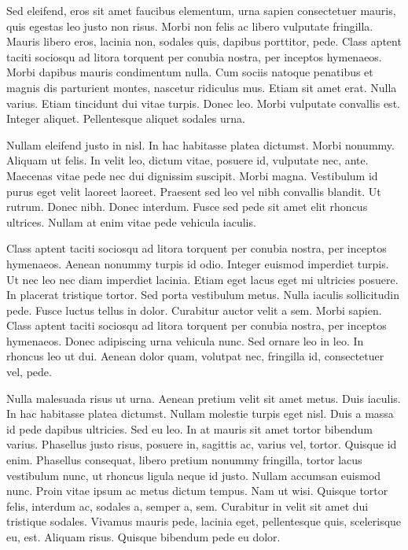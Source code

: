 \documentclass{article}
\begin{document}
Sed eleifend, eros sit amet faucibus elementum, urna sapien consectetuer
mauris, quis egestas leo justo non risus. Morbi non felis ac libero vulputate
fringilla. Mauris libero eros, lacinia non, sodales quis, dapibus porttitor,
pede. Class aptent taciti sociosqu ad litora torquent per conubia nostra, per
inceptos hymenaeos. Morbi dapibus mauris condimentum nulla. Cum sociis natoque
penatibus et magnis dis parturient montes, nascetur ridiculus mus. Etiam sit
amet erat. Nulla varius. Etiam tincidunt dui vitae turpis. Donec leo. Morbi
vulputate convallis est. Integer aliquet. Pellentesque aliquet sodales urna.

Nullam eleifend justo in nisl. In hac habitasse platea dictumst. Morbi
nonummy. Aliquam ut felis. In velit leo, dictum vitae, posuere id, vulputate
nec, ante. Maecenas vitae pede nec dui dignissim suscipit. Morbi magna.
Vestibulum id purus eget velit laoreet laoreet. Praesent sed leo vel nibh
convallis blandit. Ut rutrum. Donec nibh. Donec interdum. Fusce sed pede sit
amet elit rhoncus ultrices. Nullam at enim vitae pede vehicula iaculis.

Class aptent taciti sociosqu ad litora torquent per conubia nostra, per
inceptos hymenaeos. Aenean nonummy turpis id odio. Integer euismod imperdiet
turpis. Ut nec leo nec diam imperdiet lacinia. Etiam eget lacus eget mi
ultricies posuere. In placerat tristique tortor. Sed porta vestibulum metus.
Nulla iaculis sollicitudin pede. Fusce luctus tellus in dolor. Curabitur auctor
velit a sem. Morbi sapien. Class aptent taciti sociosqu ad litora torquent per
conubia nostra, per inceptos hymenaeos. Donec adipiscing urna vehicula nunc.
Sed ornare
leo in leo. In rhoncus leo ut dui. Aenean dolor quam, volutpat nec, fringilla id,
consectetuer vel, pede.

Nulla malesuada risus ut urna. Aenean pretium velit sit amet metus. Duis
iaculis. In hac habitasse platea dictumst. Nullam molestie turpis eget nisl.
Duis a massa id pede dapibus ultricies. Sed eu leo. In at mauris sit amet
tortor bibendum varius. Phasellus justo risus, posuere in, sagittis ac, varius
vel, tortor. Quisque id enim. Phasellus consequat, libero pretium nonummy
fringilla, tortor lacus vestibulum nunc, ut rhoncus ligula neque id justo.
Nullam accumsan euismod nunc. Proin vitae ipsum ac metus dictum tempus. Nam ut
wisi. Quisque tortor felis, interdum ac, sodales a, semper a, sem. Curabitur in
velit sit amet dui tristique sodales. Vivamus mauris pede, lacinia eget,
pellentesque quis, scelerisque eu, est. Aliquam risus. Quisque bibendum pede eu
dolor.
\end{document}
